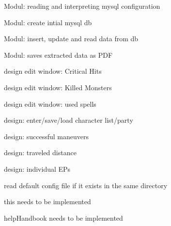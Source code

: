 
\begin{DoxyRefList}
\item[\label{todo__todo000001}%
\hypertarget{todo__todo000001}{}%
File \hyperlink{Backpack_8py}{Backpack.py} ]Modul\+: reading and interpreting mysql configuration 

Modul\+: create intial mysql db 

Modul\+: insert, update and read data from db 

Modul\+: saves extracted data as P\+DF  
\item[\label{todo__todo000002}%
\hypertarget{todo__todo000002}{}%
Namespace \hyperlink{namespacecalc__ep}{calc\+\_\+ep} ]design edit window\+: Critical Hits 

design edit window\+: Killed Monsters 

design edit window\+: used spells 

design\+: enter/save/load character list/party 

design\+: successful maneuvers 

design\+: traveled distance 

design\+: individual E\+Ps 
\item[\label{todo__todo000013}%
\hypertarget{todo__todo000013}{}%
Class \hyperlink{classrpgtoolbox_1_1confbox_1_1chkCfg}{chk\+Cfg} ]read default config file if it exists in the same directory  
\item[\label{todo__todo000004}%
\hypertarget{todo__todo000004}{}%
Global \hyperlink{classcalc__ep_1_1MainWindow_adf2bcf83729f963606d64edf1f739c03}{Main\+Window.help\+Handbook} (self)]this needs to be implemented  
\item[\label{todo__todo000009}%
\hypertarget{todo__todo000009}{}%
Global \hyperlink{classgui_1_1window_1_1MainWindow_adf2bcf83729f963606d64edf1f739c03}{Main\+Window.help\+Handbook} (self)]help\+Handbook needs to be implemented 
\end{DoxyRefList}